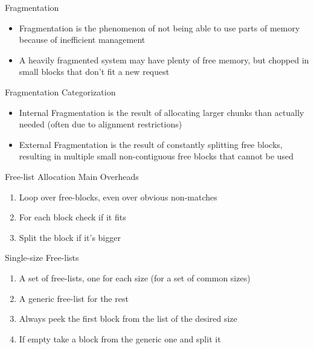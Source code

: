 \documentclass[
14pt,
aspectratio=169,
usenames,
dvipsnames,
x11names]{beamer}
\begin{document}
\begin{frame}{Fragmentation}
  \begin{itemize}  \setlength{\itemsep}{\fill}
  \item Fragmentation is the phenomenon of \alert{not being able to use parts of memory} because of inefficient management
  \item A \alert{heavily fragmented} system may have \alert{plenty of free memory}, but chopped in small blocks that \alert{don't fit} a new request
  \end{itemize}
\end{frame}

\begin{frame}{Fragmentation Categorization}
  \begin{itemize}  \setlength{\itemsep}{\fill}
  \item \alert{Internal Fragmentation} is the result of allocating larger chunks than actually needed (often due to alignment restrictions)
  \item \alert{External Fragmentation} is the result of constantly splitting free blocks, resulting in multiple small non-contiguous free blocks that cannot be used
  \end{itemize}
\end{frame}


\begin{frame}{Free-list Allocation Main Overheads}
  \begin{enumerate}  \setlength{\itemsep}{\fill}
  \item Loop over free-blocks, even over obvious non-matches
  \item For each block check if it fits
  \item Split the block if it's bigger
  \end{enumerate}
\end{frame}

\begin{frame}{Single-size Free-lists}
  \begin{enumerate}  \setlength{\itemsep}{\fill}
  \item A set of free-lists, one for each size (for a set of common sizes)
  \item A generic free-list for the rest
  \item Always peek the first block from the list of the desired size
  \item If empty take a block from the generic one and split it
  \end{enumerate}
\end{frame}
\end{document}
